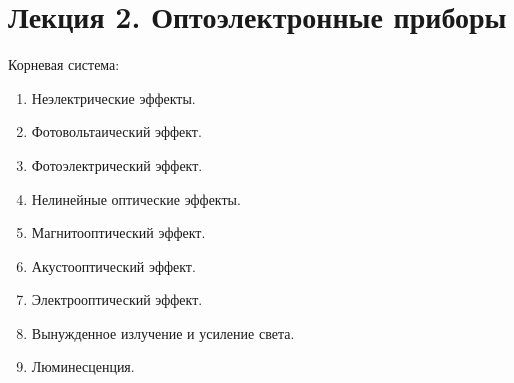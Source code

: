 \documentclass[12pt, russian, oneside, article]{ncc}
\begin{document}
\section{Лекция 2. Оптоэлектронные приборы}
\label{sec-2}


Корневая система:
\begin{enumerate}
\item Неэлектрические эффекты.
\item Фотовольтаический эффект.
\item Фотоэлектрический эффект.
\item Нелинейные оптические эффекты.
\item Магнитооптический эффект.
\item Акустооптический эффект.
\item Электрооптический эффект.
\item Вынужденное излучение и усиление света.
\item Люминесценция.
\end{enumerate}
\end{document}
